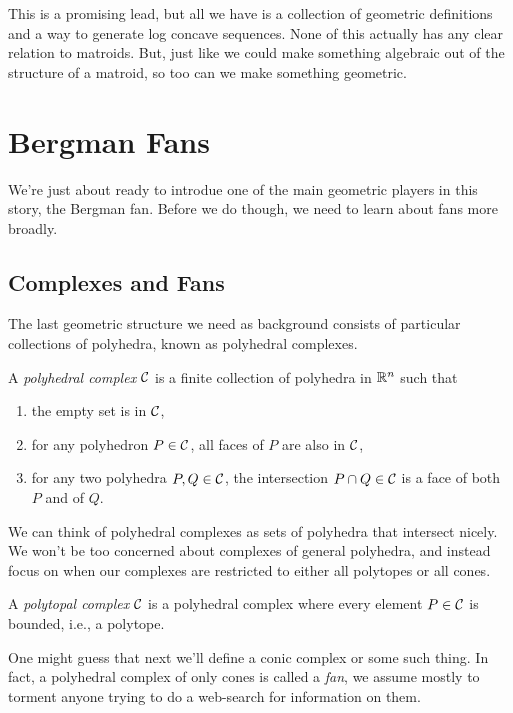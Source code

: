 \documentclass[12pt,oneside]{../../sfsuthesis}
\begin{document}
This is a promising lead, but all we have is a collection of geometric definitions and a way to generate log concave sequences.
None of this actually has any clear relation to matroids.
But, just like we could make something algebraic out of the structure of a matroid, so too can we make something geometric.

\section{Bergman Fans}

We're just about ready to introdue one of the main geometric players in this story, the Bergman fan.
Before we do though, we need to learn about fans more broadly.

\subsection{Complexes and Fans}
The last geometric structure we need as background consists of particular collections of polyhedra, known as polyhedral complexes.
\begin{definition}\th\label{def:polyhedralComplex}
    A \emph{polyhedral complex} \( \mathcal{C} \) is a finite collection of polyhedra in \( \mathbb{R}^n \) such that
    \begin{enumerate}
        \item the empty set is in \( \mathcal{C} \),
        \item for any polyhedron \( P \in \mathcal{C} \), all faces of \( P \) are also in \( \mathcal{C} \),
        \item for any two polyhedra \( P, Q \in \mathcal{C} \), the intersection \( P \cap Q \in \mathcal{C} \) is a face of both \( P \) and of \( Q \).
    \end{enumerate}
\end{definition}
We can think of polyhedral complexes as sets of polyhedra that intersect nicely.
We won't be too concerned about complexes of general polyhedra, and instead focus on when our complexes are restricted to either all polytopes or all cones.
\begin{definition}\th\label{def:polytopalComplex}
    A \emph{polytopal complex} \( \mathcal{C} \) is a polyhedral complex where every element \( P \in \mathcal{C} \) is bounded, i.e., a polytope.
\end{definition}
One might guess that next we'll define a conic complex or some such thing.
In fact, a polyhedral complex of only cones is called a \emph{fan}, we assume mostly to torment anyone trying to do a web-search for information on them.
\end{document}

